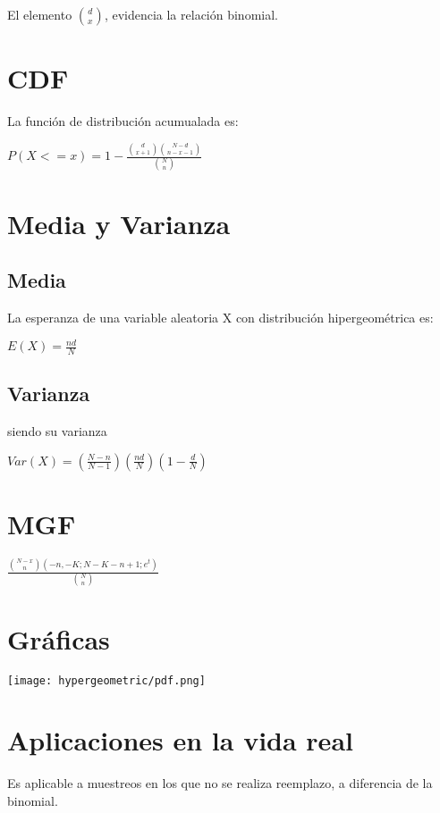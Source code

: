 El elemento ${d \choose x}$, evidencia la relación binomial.

\section{CDF}
La función de distribución acumualada es:

\begin{center}
	$P(X <= \textit{x})	= 1 - {\frac{ {d \choose x + 1} {N - d \choose n- x -1} }{ {N \choose n} }} $
\end{center}

\section{Media y Varianza}
\subsection{Media}
La esperanza de una variable aleatoria X con distribución hipergeométrica es:
\begin{center}
	$E(X) = {\frac{n d}{N}}$
\end{center}

\subsection{Varianza}
siendo su varianza
\begin{center}
	$Var(X) = (\frac{N - n}{N - 1})(\frac{nd}{N})(1 - \frac{d}{N})$
\end{center}

\section{MGF}
\begin{center}
	$\frac{{N-x \choose n}(-n,-K;N-K-n+1;e^{t})}{{N \choose n}}$
\end{center}


\section{Gráficas}
\begin{center}
	\texttt{[image: hypergeometric/pdf.png]}
\end{center}


\section{Aplicaciones en la vida real}

Es aplicable a muestreos en los que no se realiza reemplazo, a diferencia de la binomial. 